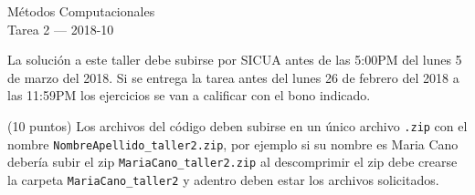 \documentclass[11pt,letterpaper]{exam}
\begin{document}
\begin{center}
{\Large Métodos Computacionales} \\
Tarea 2 --- 2018-10\\

\end{center}


\vspace{0.3cm}

\noindent
La solución a este taller debe subirse por SICUA antes de las 5:00PM
del lunes 5 de marzo del 2018. 
Si se entrega la tarea antes del lunes 26 de febrero del 2018 a las
11:59PM los ejercicios se van a calificar con el bono indicado. 
\noindent

\vspace{0.3cm}
(10 puntos) Los archivos del c\'odigo  deben subirse en un
\'unico archivo \verb".zip" con el nombre
\verb"NombreApellido_taller2.zip", por ejemplo si su nombre es Maria
Cano deber\'ia subir el zip
\verb"MariaCano_taller2.zip" al descomprimir el zip debe crearse la
carpeta \verb"MariaCano_taller2" y adentro deben estar los archivos
solicitados. 
\end{document}
